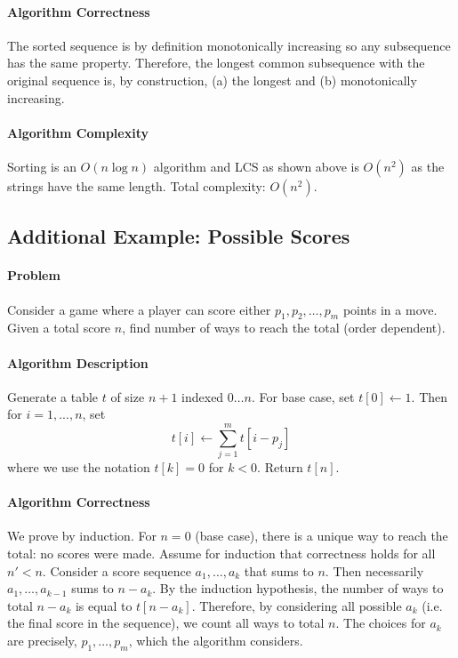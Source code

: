 \documentclass[11pt]{article}
\theoremstyle{plain}
\theoremstyle{definition}
\numberwithin{equation}{section}
\numberwithin{figure}{section}
\begin{document}
\paragraph{Algorithm Correctness} The sorted sequence is by definition monotonically increasing so any subsequence has the same property. Therefore, the longest common subsequence with the original sequence is, by construction, (a) the longest and (b) monotonically increasing.

\paragraph{Algorithm Complexity} Sorting is an $O(n \log n)$ algorithm and LCS as shown above is $O(n^2)$ as the strings have the same length. Total complexity: $O(n^2)$.

\subsection{Additional Example: Possible Scores}

\paragraph{Problem} Consider a game where a player can score either $p_1, p_2, \ldots, p_m$ points in a move. Given a total score $n$, find number of ways to reach the total (order dependent).

\paragraph{Algorithm Description} Generate a table $t$ of size $n + 1$ indexed $0 \ldots n$. For base case, set $t[0] \leftarrow 1$. Then for $i = 1, ..., n$, set
\begin{equation}
t[i] \leftarrow \sum_{j = 1}^m t[i - p_j]
\end{equation}
where we use the notation $t[k] = 0$ for $k < 0$. Return $t[n]$.

\paragraph{Algorithm Correctness} We prove by induction. For $n = 0$ (base case), there is a unique way to reach the total: no scores were made. Assume for induction that correctness holds for all $n' < n$. Consider a score sequence $a_1, \ldots, a_k$ that sums to $n$. Then necessarily $a_1, \ldots, a_{k-1}$ sums to $n - a_k$. By the induction hypothesis, the number of ways to total $n - a_k$ is equal to $t[n - a_k]$. Therefore, by considering all possible $a_k$ (i.e. the final score in the sequence), we count all ways to total $n$. The choices for $a_k$ are precisely, $p_1, \ldots, p_m$, which the algorithm considers.
\end{document}
